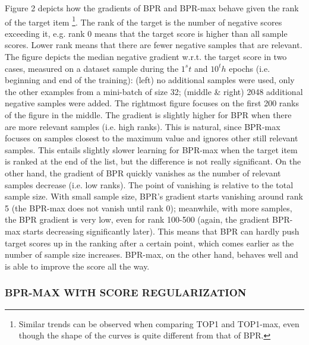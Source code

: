 Figure 2 depicts how the gradients of BPR and BPR-max behave given the rank of the target item \footnote[8]{Similar trends can be observed when comparing TOP1 and TOP1-max, even though the shape of the curves
is quite different from that of BPR.}.
The rank of the target is the number of negative scores exceeding it, e.g. rank 0 means that the target score is higher than all sample scores. Lower rank means that there are fewer negative samples that are relevant. The figure depicts the median negative gradient w.r.t. the target score in two cases, measured on a dataset sample during the $1^st$ and $10^th$ epochs (i.e. beginning and end of the training): (left) no additional samples were used, only the other examples from a mini-batch of size 32; (middle & right) 2048 additional negative samples were added. The rightmost figure focuses on the first 200 ranks of the figure in the middle. The gradient is slightly higher for BPR when there are more relevant samples (i.e. high ranks). This is natural, since BPR-max focuses on samples closest to the maximum value and ignores other still relevant samples. This entails slightly slower learning for BPR-max when the target item is ranked at the end of the list, but the difference is not really significant. On the other hand, the gradient of BPR quickly vanishes as the number of relevant samples decrease (i.e. low ranks). The point of vanishing is relative to the total sample size. With small sample size, BPR’s gradient starts vanishing around rank 5 (the BPR-max does not vanish until rank 0); meanwhile, with more samples, the BPR gradient is very low, even for rank 100-500 (again, the gradient BPR-max starts decreasing significantly later). This means that BPR can hardly push target scores up in the ranking after a certain point, which comes earlier as the number of sample size increases. BPR-max, on the other hand, behaves well and is able to improve the score all the way.

\subsubsection{ BPR-MAX WITH SCORE REGULARIZATION}


